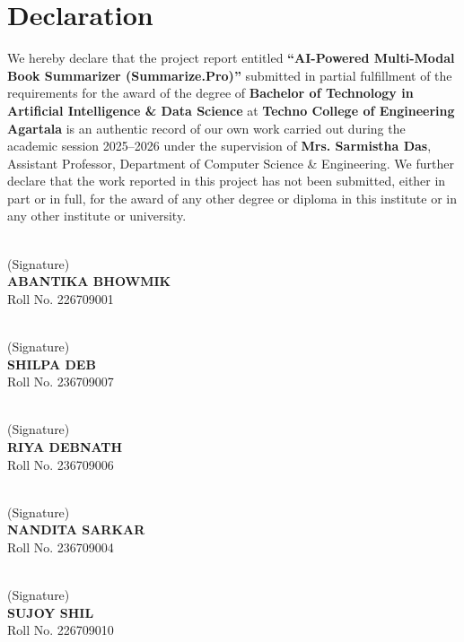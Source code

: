 \documentclass[12pt, a4paper]{report}
\begin{document}
\clearpage
{}
\setcounter{page}{1}

\chapter*{Declaration}
We hereby declare that the project report entitled \textbf{``AI-Powered Multi-Modal Book Summarizer (Summarize.Pro)''} submitted in partial fulfillment of the requirements for the award of the degree of \textbf{Bachelor of Technology in Artificial Intelligence \& Data Science} at \textbf{Techno College of Engineering Agartala} is an authentic record of our own work carried out during the academic session 2025--2026 under the supervision of \textbf{Mrs. Sarmistha Das}, Assistant Professor, Department of Computer Science \& Engineering. We further declare that the work reported in this project has not been submitted, either in part or in full, for the award of any other degree or diploma in this institute or in any other institute or university.

\vspace{2cm}
\begin{center}
  \begin{minipage}{0.4\textwidth}
    \hrulefill\\ (Signature)\\ \textbf{ABANTIKA BHOWMIK}\\ Roll No. 226709001
  \end{minipage}
  \hfill
  \begin{minipage}{0.4\textwidth}
    \hrulefill\\ (Signature)\\ \textbf{SHILPA DEB}\\ Roll No. 236709007
  \end{minipage}

  \vspace{1.2cm}
  \begin{minipage}{0.4\textwidth}
    \hrulefill\\ (Signature)\\ \textbf{RIYA DEBNATH}\\ Roll No. 236709006
  \end{minipage}
  \hfill
  \begin{minipage}{0.4\textwidth}
    \hrulefill\\ (Signature)\\ \textbf{NANDITA SARKAR}\\ Roll No. 236709004
  \end{minipage}

  \vspace{1.2cm}
  \begin{minipage}{0.4\textwidth}
    \hrulefill\\ (Signature)\\ \textbf{SUJOY SHIL}\\ Roll No. 226709010
  \end{minipage}
\end{center}
\end{document}
